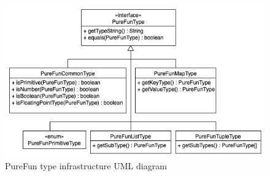 \begin{figure}[h]
	\centering
	\includegraphics[width=\textwidth]{img/PureFunType.png}
	\caption{PureFun type infrastructure UML diagram}
	\label{typeinfrfig1}
\end{figure}

